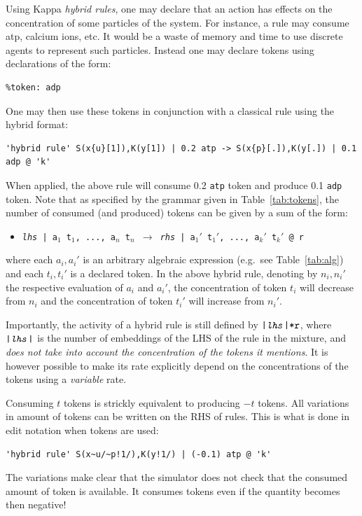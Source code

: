 \documentclass[11pt]{book}
\def\ttt#1{\texttt{#1}}
\def\rar{\rightarrow}
\def\eg{e.g.~}
\def\ITE#1{\begin{itemize}#1\end{itemize}}
\def\imp#1{\emph{#1}\index{#1}}
\begin{document}
Using Kappa \imp{hybrid rules}, one may declare that an action has
effects on the concentration of some particles of the system. For
instance, a rule may consume atp, calcium ions, etc. It would be a waste
of memory and time to use discrete agents to represent such
particles. Instead one may declare tokens using
declarations of the form:
\begin{lstlisting}[language=kappa]
%token: atp
%token: adp
\end{lstlisting}
One may then use these tokens in conjunction with a classical rule
using the hybrid format:
\begin{lstlisting}[language=kappa]
'hybrid rule' S(x{u}[1]),K(y[1]) | 0.2 atp -> S(x{p}[.]),K(y[.]) | 0.1 adp @ 'k'
\end{lstlisting}
When applied, the above rule will consume 0.2 \ttt{atp} token and
produce 0.1 \ttt{adp} token. Note that as specified by the grammar
given in Table~\ref{tab:tokens}, the number of consumed (and produced)
tokens can be given by a sum of the form: \ITE{
\item[] \ttt{\textit{lhs} | a$_1$ t$_1$, ..., a$_n$ t$_n$ $\rar$
  \textit{rhs} | a$_1'$ t$_1'$, ..., a$_k'$ t$_k'$ @ r} } where each
$a_i,a_i'$ is an arbitrary algebraic expression ({\eg}see Table~\ref{tab:alg}) and each $t_i,t_i'$ is a
declared token. In the above hybrid rule, denoting by  $n_i,n_i'$ the
respective evaluation of $a_i$ and $a_i'$, the concentration of token $t_i$ will
decrease from $n_i$ and the concentration of token $t_i'$ will
increase from $n_i'$.

Importantly, the activity of a hybrid rule is still
defined by $\ttt{|\textit{lhs}|*r}$, where $\ttt{|\textit{lhs}|}$ is
the number of embeddings of the LHS of the rule in the mixture, and
\emph{does not take into account the concentration of the tokens it
  mentions}. It is however possible to make its rate explicitly
depend on the concentrations of the tokens using a \imp{variable}
rate.

Consuming $t$ tokens is strickly equivalent to producing $-t$
tokens. All variations in amount of tokens can be written on the RHS
of rules. This is what is done in edit notation when tokens
are used:
\begin{lstlisting}[language=kappa]
'hybrid rule' S(x~u/~p!1/),K(y!1/) | (-0.1) atp @ 'k'
\end{lstlisting}

The variations make clear that the simulator
does not check that the consumed amount of token is available. It
consumes tokens even if the quantity becomes then negative!
\end{document}
